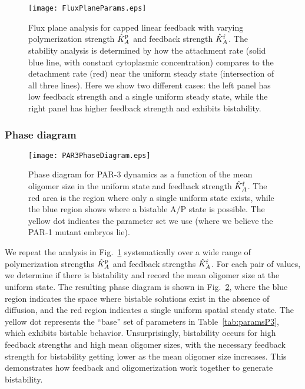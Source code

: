 \documentclass[11pt]{article}
\newcommand{\6}[1]{#1_{\text{6}}}
\newcommand{\3}[1]{#1_{\text{3}}}
\begin{document}
\begin{figure}
\centering
\texttt{[image: FluxPlaneParams.eps]}
\caption{\label{fig:P3FluxP}Flux plane analysis for capped linear feedback with varying polymerization strength $\hat{K}^\text{p}_A$ and feedback strength $\hat{K}^\text{f}_A$. The stability analysis is determined by how the attachment rate (solid blue line, with constant cytoplasmic concentration) compares to the detachment rate (red) near the uniform steady state (intersection of all three lines). Here we show two different cases: the left panel has low feedback strength and a single uniform steady state, while the right panel has higher feedback strength and exhibits bistability. }
\end{figure}

\subsubsection{Phase diagram}

\begin{figure}
\centering
\texttt{[image: PAR3PhaseDiagram.eps]}
\caption{\label{fig:P3PD}Phase diagram for PAR-3 dynamics as a function of the mean oligomer size in the uniform state and feedback strength $\hat{K}^\text{f}_A$. The red area is the region where only a single uniform state exists, while the blue region shows where a bistable A/P state is possible. The yellow dot indicates the parameter set we use (where we believe the PAR-1 mutant embryos lie).}
\end{figure}

We repeat the analysis in Fig.\ \ref{fig:P3FluxP} systematically over a wide range of polymerization strengths $\hat{K}^\text{p}_A$ and feedback strengths $\hat{K}^\text{f}_A$. For each pair of values, we determine if there is bistability and record the mean oligomer size at the uniform state. The resulting phase diagram is shown in Fig.\ \ref{fig:P3PD}, where the blue region indicates the space where bistable solutions exist in the absence of diffusion, and the red region indicates a single uniform spatial steady state. The yellow dot represents the ``base'' set of parameters in Table\ \ref{tab:paramsP3}, which exhibits bistable behavior. Unsurprisingly, bistability occurs for high feedback strengths and high mean oligomer sizes, with the necessary feedback strength for bistability getting lower as the mean oligomer size increases. This demonstrates how feedback and oligomerization work together to generate bistability. 
\end{document}
